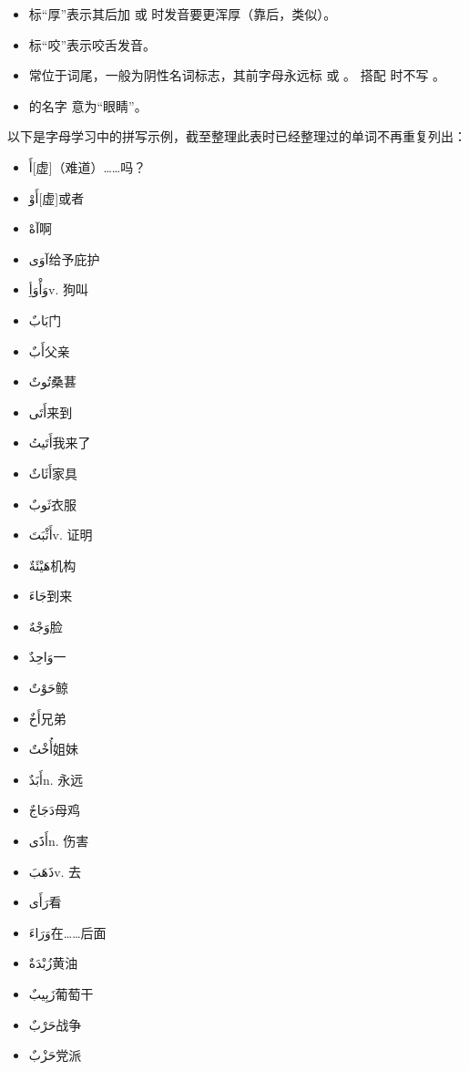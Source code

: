\begin{itemize}
    \item 标``厚''表示其后加  或  时发音要更浑厚（靠后，类似\textipa{[A]}）。
    \item 标``咬''表示咬舌发音。
    \item {} 常位于词尾，一般为阴性名词标志，其前字母永远标  或  。 搭配  时不写 。
    \item {} 的名字  意为“眼睛”。
\end{itemize}

以下是字母学习中的拼写示例，截至整理此表时已经整理过的单词不再重复列出：

\begin{itemize}
    \item {} \ac{أَ}{[虚]（难道）……吗？}
    \item \ac{أَوْ}{[虚]或者}
    \item \ac{آهْ}{啊}
    \item \ac{آوَى}{给予庇护}
    \item \ac{وَأْوَأِ}{v. 狗叫}

    \item {} \ac{بَابٌ}{门}
    \item \ac{أَبٌ}{父亲}
    \item \ac{تُوتٌ}{桑葚}
    \item \ac{أَتَى}{来到}
    \item \ac{أَتَيتُ}{我来了}
    \item \ac{أَثَاثٌ}{家具}
    \item \ac{ثَوبٌ}{衣服}
    \item \ac{أَثْبَتَ}{v. 证明}
    \item \ac{هَيْئَةٌ}{机构}

    \item {} \ac{جَاءَ}{到来}
    \item \ac{وَجْهٌ}{脸}
    \item \ac{وَاحِدٌ}{一}
    \item \ac{حَوْتٌ}{鲸}
    \item \ac{أَخٌ}{兄弟}
    \item \ac{أُخْتٌ}{姐妹}
    \item \ac{أَبَدٌ}{n. 永远}
    \item \ac{دَجَاجٌ}{母鸡}
    \item \ac{أَذََى}{n. 伤害}
    \item \ac{ذَهَبَ}{v. 去}
    \item \ac{رَأَى}{看}
    \item \ac{وَرَاءَ}{在……后面}
    \item \ac{زُبْدَةٌ}{黄油}
    \item \ac{زَبِيبٌ}{葡萄干}
    \item \ac{حَرْبٌ}{战争}
    \item \ac{حَزْبٌ}{党派}
    

\end{itemize}
